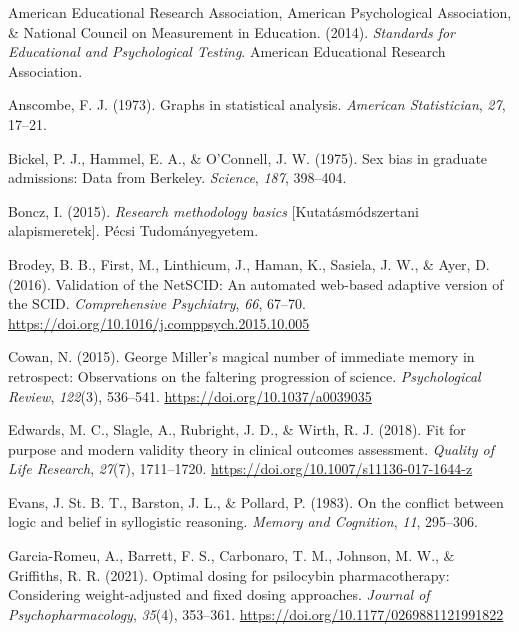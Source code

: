 \documentclass[
  11pt,
]{book}
\newlength{\cslhangindent}
\newlength{\cslentryspacingunit} %
\newenvironment{CSLReferences}[2] %
 {%
  \setlength{\parindent}{0pt}
  \ifodd #1
  \let\oldpar\par
  \def\par{\hangindent=\cslhangindent\oldpar}
  \fi
  \setlength{\parskip}{#2\cslentryspacingunit}
 }%
 {}
\theoremstyle{definition}
\theoremstyle{definition}
\theoremstyle{definition}
\theoremstyle{definition}
\theoremstyle{remark}
\begin{document}
\hypertarget{refs}{}
\begin{CSLReferences}{1}{0}
\leavevmode{}%
American Educational Research Association, American Psychological Association, \& National Council on Measurement in Education. (2014). \emph{Standards for {Educational} and {Psychological Testing}}. {American Educational Research Association}.

\leavevmode{}%
Anscombe, F. J. (1973). Graphs in statistical analysis. \emph{American Statistician}, \emph{27}, 17--21.

\leavevmode{}%
Bickel, P. J., Hammel, E. A., \& O'Connell, J. W. (1975). Sex bias in graduate admissions: Data from {B}erkeley. \emph{Science}, \emph{187}, 398--404.

\leavevmode{}%
Boncz, I. (2015). \emph{{Research methodology basics}} {[}Kutatásmódszertani alapismeretek{]}. Pécsi Tudományegyetem.

\leavevmode{}%
Brodey, B. B., First, M., Linthicum, J., Haman, K., Sasiela, J. W., \& Ayer, D. (2016). Validation of the {NetSCID}: An automated web-based adaptive version of the {SCID}. \emph{Comprehensive Psychiatry}, \emph{66}, 67--70. \url{https://doi.org/10.1016/j.comppsych.2015.10.005}

\leavevmode{}%
Cowan, N. (2015). George {Miller}'s magical number of immediate memory in retrospect: {Observations} on the faltering progression of science. \emph{Psychological Review}, \emph{122}(3), 536--541. \url{https://doi.org/10.1037/a0039035}

\leavevmode{}%
Edwards, M. C., Slagle, A., Rubright, J. D., \& Wirth, R. J. (2018). Fit for purpose and modern validity theory in clinical outcomes assessment. \emph{Quality of Life Research}, \emph{27}(7), 1711--1720. \url{https://doi.org/10.1007/s11136-017-1644-z}

\leavevmode{}%
Evans, J. St. B. T., Barston, J. L., \& Pollard, P. (1983). On the conflict between logic and belief in syllogistic reasoning. \emph{Memory and Cognition}, \emph{11}, 295--306.

\leavevmode{}%
Garcia-Romeu, A., Barrett, F. S., Carbonaro, T. M., Johnson, M. W., \& Griffiths, R. R. (2021). Optimal dosing for psilocybin pharmacotherapy: {Considering} weight-adjusted and fixed dosing approaches. \emph{Journal of Psychopharmacology}, \emph{35}(4), 353--361. \url{https://doi.org/10.1177/0269881121991822}


\end{CSLReferences}
\end{document}
